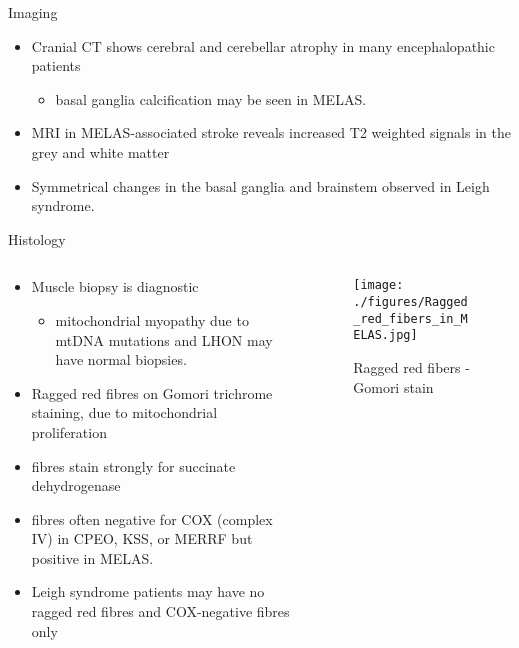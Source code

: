\documentclass[presentation, smaller]{beamer}
\begin{document}
\begin{frame}[label={sec:org62aee3d}]{Imaging}
\begin{itemize}
\item Cranial CT shows cerebral and cerebellar atrophy in many encephalopathic patients
\begin{itemize}
\item basal ganglia calcification may be seen in MELAS.
\end{itemize}
\item MRI in MELAS-associated stroke reveals increased T2 weighted signals in the grey and white matter
\item Symmetrical changes in the basal ganglia and brainstem observed in Leigh syndrome.
\end{itemize}
\end{frame}

\begin{frame}[label={sec:orgc9e9e86}]{Histology}
\begin{columns}
\begin{column}{0.6\columnwidth}
\begin{itemize}
\item Muscle biopsy is diagnostic
\begin{itemize}
\item mitochondrial myopathy due to mtDNA mutations and LHON may have normal biopsies.
\end{itemize}
\item Ragged red fibres on Gomori trichrome staining, due to mitochondrial proliferation
\item fibres stain strongly for succinate dehydrogenase
\item fibres often negative for COX (complex IV) in CPEO, KSS, or MERRF but positive in MELAS.
\item Leigh syndrome patients may have no ragged red fibres and  COX-negative fibres only
\end{itemize}
\end{column}

\begin{column}{0.4\columnwidth}
\begin{figure}[htbp]
\centering
\texttt{[image: ./figures/Ragged\_red\_fibers\_in\_MELAS.jpg]}
\caption[rrf]{\label{fig:org00a2077}
Ragged red fibers - Gomori stain}
\end{figure}
\end{column}
\end{columns}
\end{frame}
\end{document}
